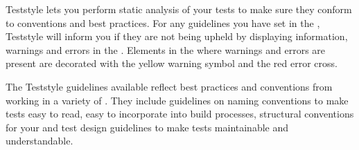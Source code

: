 
Teststyle lets you perform static analysis of your tests to make sure they conform to conventions and best practices. For any guidelines you have set in the \gdproject{}, Teststyle will inform you if they are not being upheld by displaying information, warnings and errors in the \gdprobview{}. Elements in the \gdproject{} where warnings and errors are present are decorated with the yellow warning symbol and the red error cross. 

The Teststyle guidelines available reflect best practices and conventions from working in a variety of \gdprojects{}. They include guidelines on naming conventions to make tests easy to read, easy to incorporate into build processes, structural conventions for your \gdprojects{} and test design guidelines to make tests maintainable and understandable.
